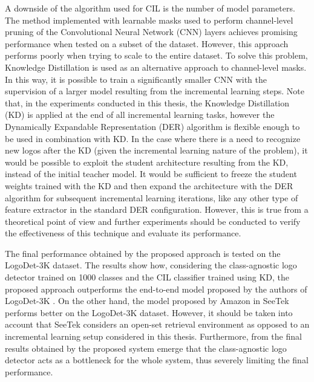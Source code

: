 A downside of the algorithm used for CIL is the number of model parameters.
The method implemented with learnable masks used to perform channel-level pruning of the Convolutional Neural Network (CNN) layers achieves promising performance when tested on a subset of the dataset.
However, this approach performs poorly when trying to scale to the entire dataset.
To solve this problem, Knowledge Distillation is used as an alternative approach to channel-level masks.
In this way, it is possible to train a significantly smaller CNN with the supervision of a larger model resulting from the incremental learning steps.
Note that, in the experiments conducted in this thesis, the Knowledge Distillation (KD) is applied at the end of all incremental learning tasks, however the Dynamically Expandable Representation (DER) algorithm \cite{yan2021dynamically} is flexible enough to be used in combination with KD.
In the case where there is a need to recognize new logos after the KD (given the incremental learning nature of the problem), it would be possible to exploit the student architecture resulting from the KD, instead of the initial teacher model.
It would be sufficient to freeze the student weights trained with the KD and then expand the architecture with the DER algorithm for subsequent incremental learning iterations, like any other type of feature extractor in the standard DER configuration.
However, this is true from a theoretical point of view and further experiments should be conducted to verify the effectiveness of this technique and evaluate its performance.

The final performance obtained by the proposed approach is tested on the LogoDet-3K dataset.
The results show how, considering the class-agnostic logo detector trained on 1000 classes and the CIL classifier trained using KD, the proposed approach outperforms the end-to-end model proposed by the authors of LogoDet-3K \cite{wang2022logodet}.
On the other hand, the model proposed by Amazon in SeeTek \cite{li2022seetek} performs better on the LogoDet-3K dataset. However, it should be taken into account that SeeTek considers an open-set retrieval environment as opposed to an incremental learning setup considered in this thesis.
Furthermore, from the final results obtained by the proposed system emerge that the class-agnostic logo detector acts as a bottleneck for the whole system, thus severely limiting the final performance.

